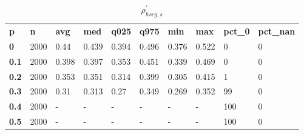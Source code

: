 \begin{table}[h]
 \centering 
\footnotesize
\caption{$\rho_{hscg,s}^\prime $}
\label{tab:alphahscgs}
\begin{tabular}[h]{| l l l l l l l l l l|
    } \hline
\textbf{ p} & \textbf{ n} & \textbf{ avg} & \textbf{ med} & \textbf{ q025} & \textbf{ q975} & \textbf{ min} & \textbf{ max} & \textbf{ pct\_0} & \textbf{ pct\_nan}
           \\
  \textbf{  0} & 2000 &  0.44 & 0.439 & 0.394 & 0.496 & 0.376 & 0.522 &   0 & 0
           \\
  \textbf{0.1} & 2000 & 0.398 & 0.397 & 0.353 & 0.451 & 0.339 & 0.469 &   0 & 0
           \\
  \textbf{0.2} & 2000 & 0.353 & 0.351 & 0.314 & 0.399 & 0.305 & 0.415 &   1 & 0
           \\
  \textbf{0.3} & 2000 &  0.31 & 0.313 &  0.27 & 0.349 & 0.269 & 0.352 &  99 & 0
           \\
  \textbf{0.4} & 2000 & - & - & - & - & - & - & 100 & 0
           \\
  \textbf{0.5} & 2000 & - & - & - & - & - & - & 100 & 0
           \\
 \hline \end{tabular}
 \end{table}
